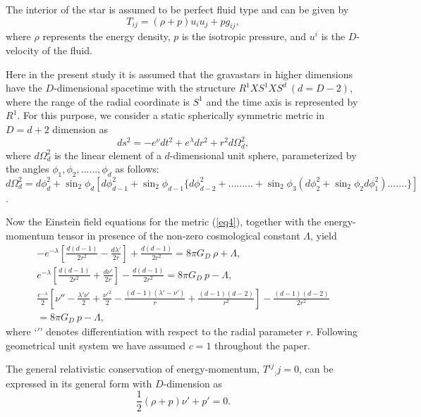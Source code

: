 \documentclass[preprint,12pt]{elsarticle}
\begin{document}
The interior of the star is assumed to be perfect fluid type and
can be given by
\begin{equation}
T_{ij} = (\rho + p ) u_i u_j + p  g_{ij}, \label{eq3}
\end{equation}
where $\rho$ represents the energy density, $p$ is  the isotropic
pressure, and  $u^{i}$ is the $D$-velocity of the fluid.

Here in the present study it is assumed that the gravastars in higher dimensions
have the $D$-dimensional spacetime with the structure $R^1 X S^1 X S^d\ (d = D - 2)$,
where the range of the radial coordinate is $S^1$ and the time axis is represented by $R^1$.
For this purpose, we consider a static spherically symmetric metric in $D = d + 2$ dimension as
\begin{equation}
ds^2 = -e^{\nu}dt^2 + e^{\lambda}dr^2+r^2 d\Omega_d ^2,\label{eq4}
\end{equation}
where $ d\Omega_d ^2$ is the linear element of a
$d$-dimensional unit sphere, parameterized by the angles $\phi_1,
\phi_2,......,\phi_d$ as follows:\\

$d\Omega_d ^2= d\phi_d^2 + \sin_2 \phi_d [d\phi_{d-1}^2 + \sin_2
\phi_{d-1}\{d\phi_{d-2}^2 + .........+ \sin_2 \phi_3(d\phi_2^2 +
\sin_2 \phi_2  d\phi_1^2).......\}] $.

Now the Einstein field equations for the metric (\ref{eq4}), together
with the energy-momentum tensor in presence of the non-zero cosmological constant $\Lambda$, yield
\begin{eqnarray}
-e^{-\lambda} \left[\frac{d(d-1)}{2r^2} - \frac{d \lambda'}{2r}
\right] + \frac{d(d-1)}{2r^2} = 8\pi G_D~ \rho + \Lambda,~~~~~~~~~~~~~~~~~~~~~~~~~~~~~~~~~ \label{eq5}\\
e^{-\lambda} \left[\frac{d(d-1)}{2r^2} + \frac{d \nu'}{2r} \right]
- \frac{d(d-1)}{2r^2} = 8\pi G_D ~p -\Lambda, ~~~~~~~~~~~~~~~~~~~~~~~~~~~~~~~~~~\label{eq6}\\
\frac{e^{-\lambda}}{2} \left[ \nu'' -\frac{\lambda'\nu'}{2}
+\frac{ {\nu'}^2}{2} -\frac{(d-1)(\lambda'-\nu')}{r} +
\frac{(d-1)(d-2) }{r^2} \right]- \frac{(d-1)(d-2)
}{2r^2} \nonumber \\  = 8\pi G_D~p -\Lambda,\label{eq7}~~~~~~~~~~~~
\end{eqnarray}
where `$\prime$' denotes differentiation with respect to the radial parameter $r$. Following geometrical unit system we
have assumed $c = 1$ throughout the paper.

The general relativistic conservation of energy-momentum, ${T^{ij}}_;j=0$,
can be expressed in its general form with $D$-dimension as
\begin{equation}
\frac{1}{2} \left(\rho + p\right)\nu' + p' =0 . \label{eq8}
\end{equation}
\end{document}
